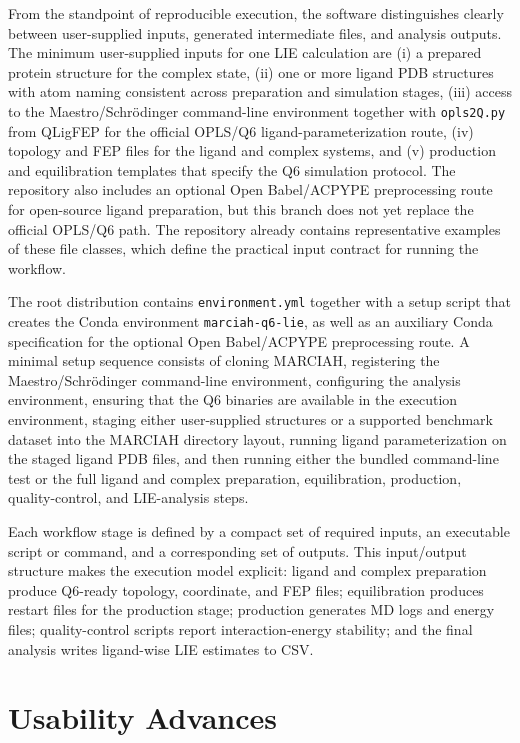 \documentclass[journal=jcisd8,manuscript=article]{achemso}
\begin{document}
From the standpoint of reproducible execution, the software distinguishes clearly between user-supplied inputs, generated intermediate files, and analysis outputs. The minimum user-supplied inputs for one LIE calculation are (i) a prepared protein structure for the complex state, (ii) one or more ligand PDB structures with atom naming consistent across preparation and simulation stages, (iii) access to the Maestro/Schr\"odinger command-line environment together with \texttt{opls2Q.py} from QLigFEP for the official OPLS/Q6 ligand-parameterization route, (iv) topology and FEP files for the ligand and complex systems, and (v) production and equilibration templates that specify the Q6 simulation protocol. The repository also includes an optional Open Babel/ACPYPE preprocessing route for open-source ligand preparation, but this branch does not yet replace the official OPLS/Q6 path. The repository already contains representative examples of these file classes, which define the practical input contract for running the workflow.

The root distribution contains \texttt{environment.yml} together with a setup script that creates the Conda environment \texttt{marciah-q6-lie}, as well as an auxiliary Conda specification for the optional Open Babel/ACPYPE preprocessing route. A minimal setup sequence consists of cloning MARCIAH, registering the Maestro/Schr\"odinger command-line environment, configuring the analysis environment, ensuring that the Q6 binaries are available in the execution environment, staging either user-supplied structures or a supported benchmark dataset into the MARCIAH directory layout, running ligand parameterization on the staged ligand PDB files, and then running either the bundled command-line test or the full ligand and complex preparation, equilibration, production, quality-control, and LIE-analysis steps.

Each workflow stage is defined by a compact set of required inputs, an executable script or command, and a corresponding set of outputs. This input/output structure makes the execution model explicit: ligand and complex preparation produce Q6-ready topology, coordinate, and FEP files; equilibration produces restart files for the production stage; production generates MD logs and energy files; quality-control scripts report interaction-energy stability; and the final analysis writes ligand-wise LIE estimates to CSV.

\section{Usability Advances}
\end{document}
